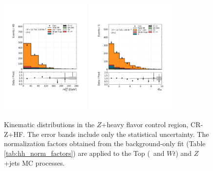 \begin{figure}[!htb]
    \includegraphics[width=0.4\textwidth]{figures/search_hh/bkg_estimate/crvr/crzhf/crztest_mt2_bb}
    \includegraphics[width=0.4\textwidth]{figures/search_hh/bkg_estimate/crvr/crzhf/crztest_NN_d_hh}
    \caption{
    Kinematic distributions in the $Z$+heavy flavor control region, CR-Z+HF.
    The error bands include only the statistical uncertainty.
    The normalization factors obtained from the background-only fit (Table \ref{tab:hh_norm_factors}) are applied
    to the Top (\ttbar~and $Wt$) and $Z$+jets MC processes.
    }
    \label{fig:crz_kin_plots_2}
\end{figure}
